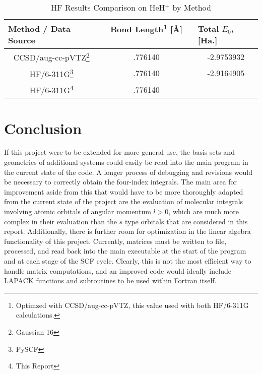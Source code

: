 \documentclass[%
 aip,
 amsmath,amssymb,
 reprint,%
]{revtex4-1}
\begin{document}
\begin{table}[]
\caption{HF Results Comparison on HeH$^{+}$ by Method}
\label{tab:hf_results}
\begin{ruledtabular}
\begin{tabular}{|c|c|c|}
\hline
\multicolumn{1}{|l|}{\textbf{Method / Data Source}} &
\multicolumn{1}{c|}{\textbf{Bond Length\footnote{Optimzed with
CCSD/aug-cc-pVTZ, this value used with both HF/6-311G calculations.} [Å] \ \ \ \ }} 
& \multicolumn{1}{l|}{\textbf{Total $E_0$, [Ha.]}} \\ \hline
CCSD/aug-cc-pVTZ\footnote{Gaussian 16}      & .776140  & -2.9753932    \\ \hline 
HF/6-311G\footnote{PySCF}     & .776140     & -2.9164905    \\ \hline
HF/6-311G\footnote{This Report}  & .776140  &          \\ \hline
\end{tabular}
\end{ruledtabular}
\end{table}


\section{Conclusion}
If this project were to be extended for more general use, the basis sets and
geometries of additional systems could easily be read into the main program in
the current state of the code. A longer process of debugging and revisions
would be necessary to correctly obtain the four-index integrals. The main area
for improvement aside from this that would have to be more thoroughly adapted
from the current state of the project are the evaluation of molecular
integrals involving atomic orbitals of angular momentum $l > 0$, which are
much more complex in their evaluation than the $s$ type orbitals that are
considered in this report. Additionally, there is further room for
optimization in the linear algebra functionality of this project. Currently,
matrices must be written to file, processed, and read back into the main
executable at the start of the program and at each stage of the SCF cycle.
Clearly, this is not the most efficient way to handle matrix computations, and
an improved code would ideally include LAPACK functions and subroutines to be
used within Fortran itself.


\end{document}
